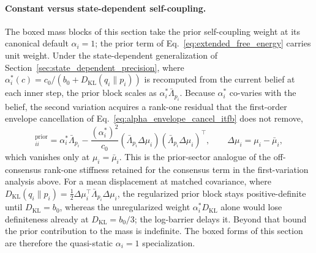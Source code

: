 \documentclass[11pt]{article}
\begin{document}
\paragraph{Constant versus state-dependent self-coupling.} The boxed mass blocks of this section take the prior self-coupling weight at its canonical default $\alpha_i = 1$; the prior term of Eq.~\eqref{eq:extended_free_energy} carries unit weight. Under the state-dependent generalization of Section~\ref{sec:state_dependent_precision}, where $\alpha_i^*(c) = c_0/(b_0 + D_{\mathrm{KL}}(q_i \| p_i))$ is recomputed from the current belief at each inner step, the prior block scales as $\alpha_i^* \bar{\Lambda}_{p_i}$. Because $\alpha_i^*$ co-varies with the belief, the second variation acquires a rank-one residual that the first-order envelope cancellation of Eq.~\eqref{eq:alpha_envelope_cancel_itfb} does not remove,
\begin{equation}
[M_{\mu\mu}]_{ii}^{\text{prior}} = \alpha_i^* \bar{\Lambda}_{p_i} - \frac{(\alpha_i^*)^2}{c_0}\left(\bar{\Lambda}_{p_i}\Delta\mu_i\right)\left(\bar{\Lambda}_{p_i}\Delta\mu_i\right)^\top, \qquad \Delta\mu_i = \mu_i - \bar{\mu}_i,
\end{equation}
which vanishes only at $\mu_i = \bar{\mu}_i$. This is the prior-sector analogue of the off-consensus rank-one stiffness retained for the consensus term in the first-variation analysis above. For a mean displacement at matched covariance, where $D_{\mathrm{KL}}(q_i \| p_i) = \tfrac{1}{2}\Delta\mu_i^\top \bar{\Lambda}_{p_i}\Delta\mu_i$, the regularized prior block stays positive-definite until $D_{\mathrm{KL}} = b_0$, whereas the unregularized weight $\alpha_i^* D_{\mathrm{KL}}$ alone would lose definiteness already at $D_{\mathrm{KL}} = b_0/3$; the log-barrier delays it. Beyond that bound the prior contribution to the mass is indefinite. The boxed forms of this section are therefore the quasi-static $\alpha_i = 1$ specialization.
\end{document}
